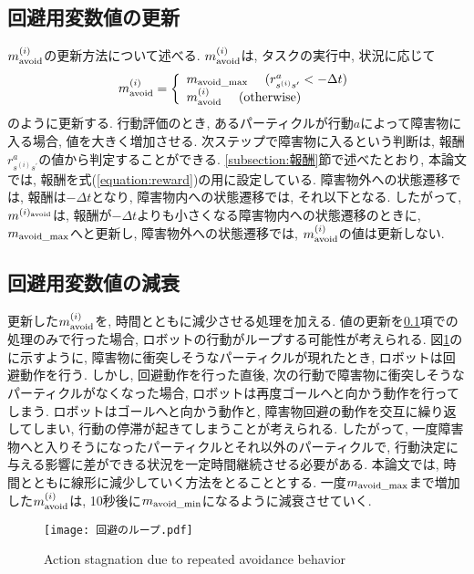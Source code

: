 \subsection{回避用変数値の更新} \label{subsection:回避用変数値の更新}
$m^{(i)}_{\rm avoid}$の更新方法について述べる. 
$m^{(i)}_{\rm avoid}$は, タスクの実行中, 状況に応じて
\begin{equation}
\label{equation:reward}
  m^{(i)}_{\rm avoid} =
  \left\{
    \begin{array}{l}
      m_{\rm avoid\_max} \ \ \ \ (r^{a}_{s^{(i)}s^{\prime}} < - \Delta t) \\
      m^{(i)}_{\rm avoid} \ \ \ \ ({\rm otherwise})
    \end{array}
  \right.
\end{equation}
のように更新する. 
行動評価のとき, あるパーティクルが行動$a$によって障害物に入る場合, 値を大きく増加させる. 
次ステップで障害物に入るという判断は, 報酬$r^{a}_{s^{(i)}s^{\prime}}$の値から判定することができる. 
\ref{subsection:報酬}節で述べたとおり, 本論文では, 報酬を式(\ref{equation:reward})の用に設定している. 
障害物外への状態遷移では, 報酬は$-\Delta t$となり, 障害物内への状態遷移では, それ以下となる. 
したがって, $m^{(i)_{\rm avoid}}$は, 
報酬が$-\Delta t$よりも小さくなる障害物内への状態遷移のときに, $m_{\rm avoid\_max}$へと更新し, 
障害物外への状態遷移では, $m^{(i)}_{\rm avoid}$の値は更新しない. 

\subsection{回避用変数値の減衰}
更新した$m^{(i)}_{\rm avoid}$を, 時間とともに減少させる処理を加える. 
値の更新を\ref{subsection:回避用変数値の更新}項での処理のみで行った場合, ロボットの行動がループする可能性が考えられる. 
図\ref{fig:回避のループ}のに示すように, 障害物に衝突しそうなパーティクルが現れたとき, ロボットは回避動作を行う. 
しかし, 回避動作を行った直後, 次の行動で障害物に衝突しそうなパーティクルがなくなった場合, ロボットは再度ゴールへと向かう動作を行ってしまう. 
ロボットはゴールへと向かう動作と, 障害物回避の動作を交互に繰り返してしまい, 行動の停滞が起きてしまうことが考えられる. 
したがって, 一度障害物へと入りそうになったパーティクルとそれ以外のパーティクルで, 行動決定に与える影響に差ができる状況を一定時間継続させる必要がある. 
本論文では, 時間とともに線形に減少していく方法をとることとする. 
一度$m_{\rm avoid\_max}$まで増加した$m^{(i)}_{\rm avoid}$は, 10秒後に$m_{\rm avoid\_min}$になるように減衰させていく. 

\begin{figure}[h]
  \begin{center}
    \texttt{[image: 回避のループ.pdf]}
    \caption{Action stagnation due to repeated avoidance behavior}
    \label{fig:回避のループ}
  \end{center}
\end{figure}
